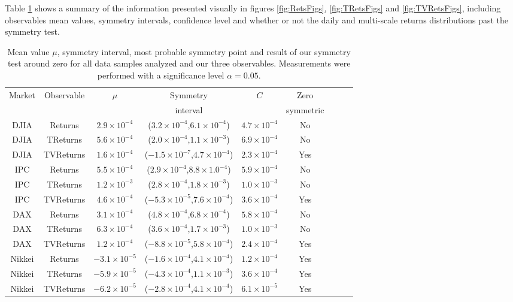 \documentclass{elsarticle}
\begin{document}
Table \ref{tab:confidence} shows a summary of the information presented visually in figures \ref{fig:RetsFigs}, \ref{fig:TRetsFigs} and \ref{fig:TVRetsFigs}, including observables mean values, symmetry intervals, confidence level and whether or not the daily and multi-scale returns distributions past the symmetry test.

\begin{table}[h!tb]
	\begin{center}
		\setlength\tabcolsep{1.6pt} %
		{\renewcommand{\arraystretch}{1} %
		\begin{tabular}{|c|c|c|c|c|c|c|c|c|}
			\hline
			Market&Observable&$\mu$&Symmetry&$C$&Zero\\ 
			& & &interval& & symmetric\\
			\hline
			\hline
			DJIA&Returns&$2.9\!\times\!10^{-4}$&($3.2\!\times\!10^{-4}$,$6.1\!\times\!10^{-4}$)&$4.7\!\times\!10^{-4}$&No\\
			\hline
			DJIA&TReturns&$5.6\!\times\!10^{-4}$&($2.0\!\times\!10^{-4}$,$1.1\!\times\!10^{-3}$)&$6.9\!\times\!10^{-4}$&No\\
			\hline
			DJIA&TVReturns&$1.6\!\times\!10^{-4}$&($-1.5\!\times\!10^{-7}$,$4.7\!\times\!10^{-4}$)&$2.3\!\times\!10^{-4}$&Yes\\
			\hline
			IPC&Returns&$5.5\!\times\!10^{-4}$&($2.9\!\times\!10^{-4}$,$8.8\!\times\!1.0^{-4}$)&$5.9\!\times\!10^{-4}$&No\\
			\hline
			IPC&TReturns&$1.2\!\times\!10^{-3}$&($2.8\!\times\!10^{-4}$,$1.8\!\times\!10^{-3}$)&$1.0\!\times\!10^{-3}$&No\\
			\hline
			IPC&TVReturns&$4.6\!\times\!10^{-4}$&($-5.3\!\times\!10^{-5}$,$7.6\!\times\!10^{-4}$)&$3.6\!\times\!10^{-4}$&Yes\\
			\hline
			DAX&Returns&$3.1\!\times\!10^{-4}$&($4.8\!\times\!10^{-4}$,$6.8\!\times\!10^{-4}$)&$5.8\!\times\!10^{-4}$&No\\
			\hline
			DAX&TReturns&$6.3\!\times\!10^{-4}$&($3.6\!\times\!10^{-4}$,$1.7\!\times\!10^{-3}$)&$1.0\!\times\!10^{-3}$&No\\
			\hline
			DAX&TVReturns&$1.2\!\times\!10^{-4}$&($-8.8\!\times\!10^{-5}$,$5.8\!\times\!10^{-4}$)&$2.4\!\times\!10^{-4}$&Yes\\
			\hline
			Nikkei&Returns&$-3.1\!\times\!10^{-5}$&($-1.6\!\times\!10^{-4}$,$4.1\!\times\!10^{-4}$)&$1.2\!\times\!10^{-4}$&Yes\\
			\hline
			Nikkei&TReturns&$-5.9\!\times\!10^{-5}$&($-4.3\!\times\!10^{-4}$,$1.1\!\times\!10^{-3}$)&$3.6\!\times\!10^{-4}$&Yes\\
			\hline
			Nikkei&TVReturns&$-6.2\!\times\!10^{-5}$&($-2.8\!\times\!10^{-4}$,$4.1\!\times\!10^{-4}$)&$6.1 \times 10^{-5}$&Yes\\
			\hline
			\hline
		\end{tabular}
		}
	\caption[]{\small Mean value $\mu$, symmetry interval, most probable symmetry point and result of our symmetry test around zero for all data samples analyzed and our three observables. Measurements were performed with a significance level $\alpha = 0.05$.}
	\label{tab:confidence}
	\end{center}
\end{table}
\end{document}
